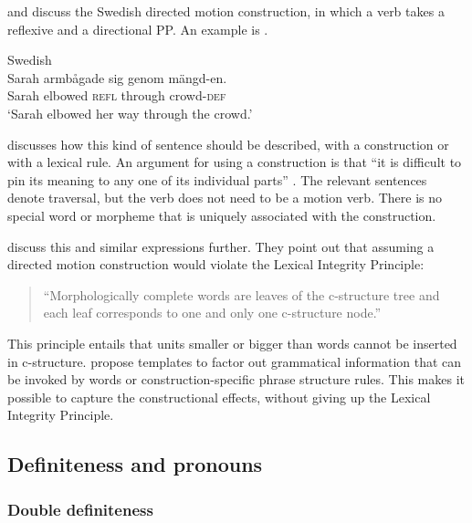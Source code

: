 \documentclass[output=paper,hidelinks]{langscibook}
\begin{document}
\citet{Toivonen02} and \citet{asudeh2013constructions} discuss the Swedish directed motion construction, in which a verb takes a reflexive and a directional PP. An example is .



\ea\label{ex:Scandinavian:95} Swedish \citep[13]{asudeh2013constructions}\\
\gll
 {Sarah} {armbågade} {sig} {genom} {mängd-en.}\\
 Sarah elbowed \textsc{refl} through crowd-\textsc{def}\\
\glt `Sarah elbowed her way through the crowd.'\z

\noindent \citet{Toivonen02} discusses how this kind of sentence should be described, with a construction or with a lexical rule. An argument for using a construction is that ``it is difficult to pin its meaning to any one of its individual parts'' \citep[342]{Toivonen02}. The relevant sentences denote traversal, but the verb does not need to be a motion verb. There is no special word or morpheme that is uniquely associated with the construction.

 \citet{asudeh2013constructions} discuss this and similar expressions further. They point out that assuming a directed motion construction would violate the Lexical Integrity Principle:

 \begin{quote}
   ``Morphologically complete words are leaves of the c-structure tree and each leaf corresponds to one and only one c-structure node.'' \citep[92]{BresnanEtAl2016}
 \end{quote}

This principle entails that units smaller or bigger than words cannot be inserted in c-structure. \citet{asudeh2013constructions} propose templates to factor out grammatical information that can be invoked by words or construction-specific phrase structure rules. This makes it possible to capture the constructional effects, without giving up the Lexical Integrity Principle.

\subsection{Definiteness and pronouns}

\subsubsection{Double definiteness}
\end{document}
